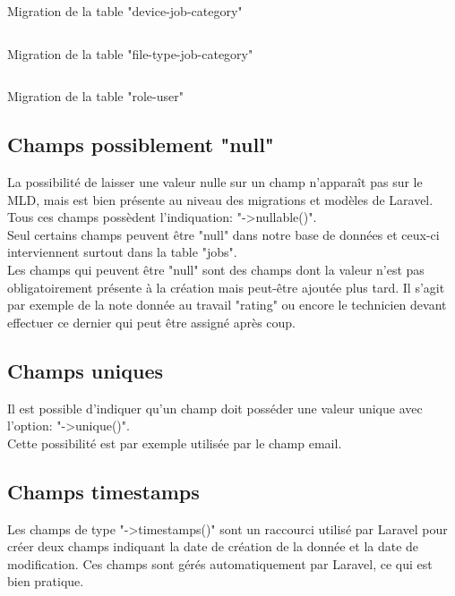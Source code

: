 \documentclass[
    iai, %
    il, %
]{heig-tb}
\begin{document}
\begin{listing}[h]
    \inputminted{php}{assets/code/20_create_device_job_category_table.php}
    \caption{Migration de la table "device-job-category" \label{migrations-device-job-category}}
\end{listing}

\begin{listing}[h]
    \inputminted{php}{assets/code/21_create_file_type_job_category_table.php}
    \caption{Migration de la table "file-type-job-category" \label{migrations-file-type-job-category}}
\end{listing}

\begin{listing}[h]
    \inputminted{php}{assets/code/22_create_role_user_table.php}
    \caption{Migration de la table "role-user" \label{migrations-role-user}}
\end{listing}

\subsection{Champs possiblement "null"}
La possibilité de laisser une valeur nulle sur un champ n'apparaît pas sur le MLD, mais est bien présente au niveau des migrations et modèles de Laravel.\\
Tous ces champs possèdent l'indiquation: "->nullable()".\\
Seul certains champs peuvent être "null" dans notre base de données et ceux-ci interviennent surtout dans la table "jobs".\\
Les champs qui peuvent être "null" sont des champs dont la valeur n'est pas obligatoirement présente à la création mais peut-être ajoutée plus tard. Il s'agit par exemple de la note donnée au travail "rating" ou encore le technicien devant effectuer ce dernier qui peut être assigné après coup.

\subsection{Champs uniques}
Il est possible d'indiquer qu'un champ doit posséder une valeur unique avec l'option: "->unique()".\\
Cette possibilité est par exemple utilisée par le champ email.

\subsection{Champs timestamps}
Les champs de type "->timestamps()" sont un raccourci utilisé par Laravel pour créer deux champs indiquant la date de création de la donnée et la date de modification. Ces champs sont gérés automatiquement par Laravel, ce qui est bien pratique.
\end{document}
